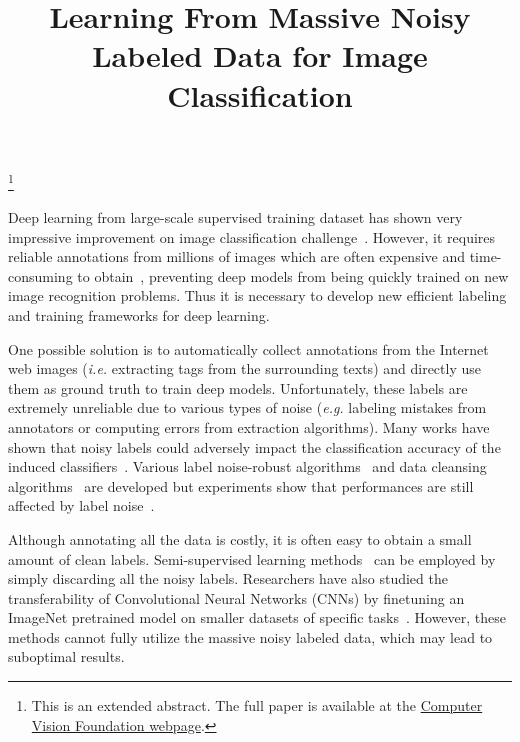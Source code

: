 \documentclass[extendedabs]{bmvc2k}
\begin{document}
\title{Learning From Massive Noisy Labeled Data for Image Classification}

\maketitle
\let\thefootnote\relax\footnote{This is an extended abstract. The full paper is available at the \href{http://www.cv-foundation.org/openaccess/CVPR2015.py}{Computer Vision Foundation webpage}. }
\vspace{-0.2in}

\noindent
Deep learning from large-scale supervised training dataset has shown very impressive improvement on image classification challenge~\cite{krizhevsky2012imagenet}. However, it requires reliable annotations from millions of images which are often expensive and time-consuming to obtain~\cite{deng2009imagenet}, preventing deep models from being quickly trained on new image recognition problems. Thus it is necessary to develop new efficient labeling and training frameworks for deep learning.

One possible solution is to automatically collect annotations from the Internet web images (\emph{i.e.} extracting tags from the surrounding texts) and directly use them as ground truth to train deep models. Unfortunately, these labels are extremely unreliable due to various types of noise (\emph{e.g.} labeling mistakes from annotators or computing errors from extraction algorithms). Many works have shown that noisy labels could adversely impact the classification accuracy of the induced classifiers~\cite{nettleton2010study}. Various label noise-robust algorithms~\cite{manwani2013noise} and data cleansing algorithms~\cite{brodley2011identifying} are developed but experiments show that performances are still affected by label noise~\cite{bartlett2006convexity}.

Although annotating all the data is costly, it is often easy to obtain a small amount of clean labels. Semi-supervised learning methods~\cite{lee2013pseudo} can be employed by simply discarding all the noisy labels. Researchers have also studied the transferability of Convolutional Neural Networks (CNNs) by finetuning an ImageNet pretrained model on smaller datasets of specific tasks~\cite{oquab2014learning}. However, these methods cannot fully utilize the massive noisy labeled data, which may lead to suboptimal results.
\end{document}
